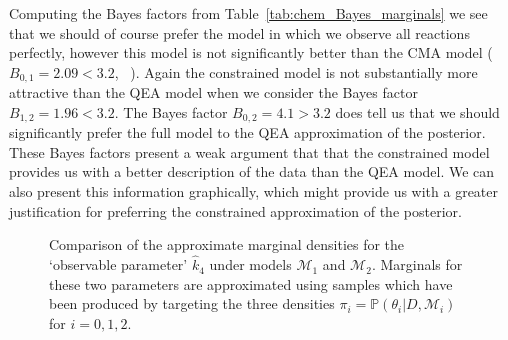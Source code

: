 \documentclass[final]{siamltex}
\begin{document}
Computing the Bayes factors from Table~\ref{tab:chem_Bayes_marginals} we see that we should of course prefer the model in which we observe all reactions perfectly, however this model is not significantly better than the CMA model ($B_{0,1} = 2.09 < 3.2$, ~\cite{kass1995bayes}). Again the constrained model is not substantially more attractive than the QEA model when we consider the Bayes factor $B_{1,2} = 1.96 < 3.2$. The Bayes factor $B_{0,2} = 4.1 > 3.2$ does tell us that we should significantly prefer the full model to the QEA approximation of the posterior. These Bayes factors present a weak argument that that the constrained model provides us with a better description of the data than the QEA model. We can also present this information graphically, which might provide us with a greater justification for preferring the constrained approximation of the posterior.

\begin{figure}[!htb]
\centering
{}
\caption{Comparison of the approximate marginal densities for the `observable parameter' $\hat{k}_4$ under models $\mathcal{M}_1$ and $\mathcal{M}_2$. Marginals for these two parameters are approximated using samples which have been produced by targeting the three densities $\pi_i = \mathbb{P}(\theta_i|D,\mathcal{M}_i)$ for $i = 0, 1, 2$.}
\label{fig:chem_model_comp}
\end{figure}
\end{document}
